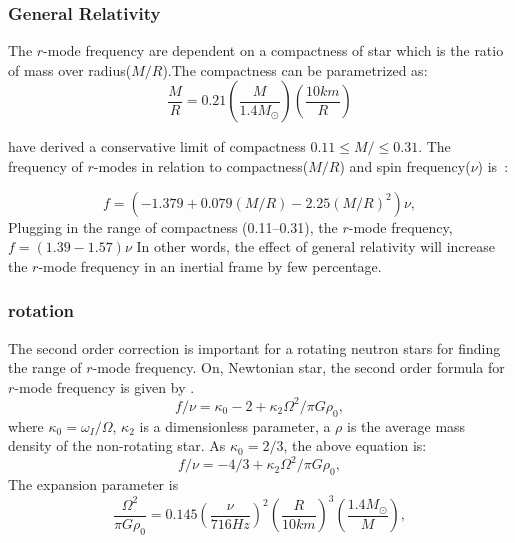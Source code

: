 \documentclass{ttuthes2007}
\begin{document}
\subsubsection{General Relativity}
The $r$-mode frequency are dependent on a compactness of star which is the ratio
of mass over radius($M/R$).The compactness can be parametrized as:
\begin{equation}
\frac{M}{R}=0.21\left(\frac{M}{1.4M_\odot}\right)\left(\frac{10km}{R}\right)
\end{equation} 

\citet{Idrisy_2015} have derived a conservative limit of compactness $0.11 \leq
M/ \leq 0.31$. The frequency of $r$-modes in relation to
compactness($M/R$) and spin frequency($\nu$) is~\cite{Idrisy_2015}: 

\begin{equation}
f=(-1.379 + 0.079(M/R) - 2.25(M/R)^2)\nu,
\end{equation}  
Plugging in the range of compactness (0.11--0.31), the $r$-mode frequency,
$f=(1.39-1.57)\nu$
In other words, the effect of general relativity will increase the $r$-mode frequency in an
inertial frame by few percentage.

\subsubsection{rotation}
The second order correction is important for a rotating neutron stars for
finding the range of $r$-mode frequency.
On, Newtonian star, the second order formula for $r$-mode frequency is given by 
\cite{Lindblom_1999}.
\begin{equation}
f/\nu=\kappa_0 - 2 + \kappa_2 \Omega^2/\pi G \rho_0,
\end{equation}
where $\kappa_0=\omega_I/\Omega$, $\kappa_2$ is a dimensionless parameter,
a $\rho$ is the average mass density of the non-rotating star.
As $\kappa_0=2/3$, the above equation is:
\begin{equation}
f/\nu = -4/3 + \kappa_2 \Omega^2/\pi G \rho_0,
\end{equation}
The expansion parameter is
\begin{equation}
\frac{\Omega^2}{\pi G \rho_0}=0.145 \left(\frac{\nu}{716 Hz}\right)^2
\left(\frac{R}{10km}\right)^3 \left(\frac{1.4M_\odot}{M}\right),
\end{equation}
\end{document}
